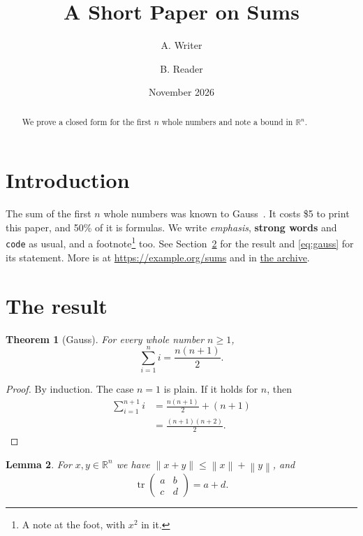 \documentclass[11pt]{article}
\title{A Short Paper on Sums}
\author{A. Writer \and B. Reader}
\date{November 2026}
\newcommand{\R}{\mathbb{R}}
\newcommand{\norm}[1]{\left\lVert #1 \right\rVert}
\DeclareMathOperator{\tr}{tr}
\newtheorem{theorem}{Theorem}
\newtheorem{lemma}[theorem]{Lemma}
\begin{document}
\maketitle

\begin{abstract}
We prove a closed form for the first $n$ whole numbers and note a bound in $\R^n$.
\end{abstract}

\section{Introduction}\label{sec:intro}

The sum of the first $n$ whole numbers was known to Gauss~\cite{gauss}.
It costs \$5 to print this paper, and 50\% of it is formulas.
We write \emph{emphasis}, \textbf{strong words} and \texttt{code} as usual,
and a footnote\footnote{A note at the foot, with $x^2$ in it.} too.
See Section~\ref{sec:result} for the result and \eqref{eq:gauss} for its statement.
More is at \url{https://example.org/sums} and in \href{https://example.org}{the archive}.

\section{The result}\label{sec:result}

\begin{theorem}[Gauss]\label{thm:gauss}
For every whole number $n \ge 1$,
\begin{equation}\label{eq:gauss}
  \sum_{i=1}^{n} i = \frac{n(n+1)}{2}.
\end{equation}
\end{theorem}

\begin{proof}
By induction. The case $n = 1$ is plain. If it holds for $n$, then
\begin{align}
  \sum_{i=1}^{n+1} i &= \frac{n(n+1)}{2} + (n+1) \\
                     &= \frac{(n+1)(n+2)}{2}. \nonumber
\end{align}
\end{proof}

\begin{lemma}\label{lem:norm}
For $x, y \in \R^n$ we have $\norm{x + y} \le \norm{x} + \norm{y}$, and
\[
  \tr\begin{pmatrix} a & b \\ c & d \end{pmatrix} = a + d .
\]
\end{lemma}
\end{document}
